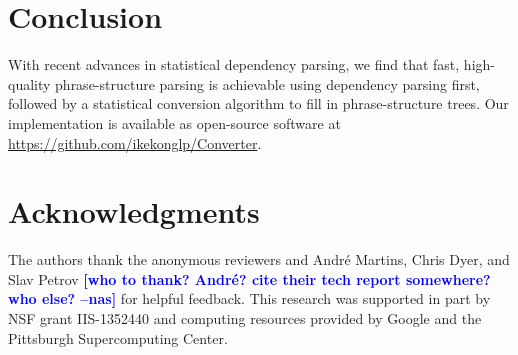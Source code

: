 \documentclass[11pt,letterpaper]{article}
\newcommand{\RuleA}[3]{#1 \rightarrow #2^*\ #3}
\newcommand{\RuleB}[3]{#1 \rightarrow #2\ #3^*}
\newcommand{\ParserUrl}{\url{https://github.com/ikekonglp/Converter}}
\newcommand{\nascomment}[1]{\textcolor{blue}{\bf \small [#1 --nas]}}
\begin{document}



\section{Conclusion}

With recent advances in statistical dependency parsing, we find that
fast, high-quality phrase-structure parsing is achievable using dependency
parsing first, followed by a statistical conversion algorithm to
fill in phrase-structure trees. 
Our implementation is available as open-source software at \ParserUrl.

\section*{Acknowledgments}
The authors thank the anonymous reviewers
and Andr\'{e} Martins, Chris Dyer, and Slav Petrov \nascomment{who to thank?  Andr\'{e}?  cite their tech report
  somewhere?  who else?} for helpful feedback.
This research was supported in part by NSF grant IIS-1352440 and computing resources provided by Google and the Pittsburgh Supercomputing Center.











\end{document}
